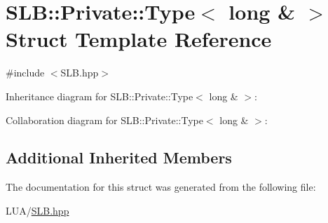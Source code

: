 \hypertarget{structSLB_1_1Private_1_1Type_3_01long_01_6_01_4}{}\section{S\+LB\+:\+:Private\+:\+:Type$<$ long \& $>$ Struct Template Reference}
\label{structSLB_1_1Private_1_1Type_3_01long_01_6_01_4}


{\ttfamily \#include $<$S\+L\+B.\+hpp$>$}



Inheritance diagram for S\+LB\+:\+:Private\+:\+:Type$<$ long \& $>$\+:


Collaboration diagram for S\+LB\+:\+:Private\+:\+:Type$<$ long \& $>$\+:
\subsection*{Additional Inherited Members}


The documentation for this struct was generated from the following file\+:\begin{DoxyCompactItemize}
\item 
L\+U\+A/\hyperlink{SLB_8hpp}{S\+L\+B.\+hpp}\end{DoxyCompactItemize}
